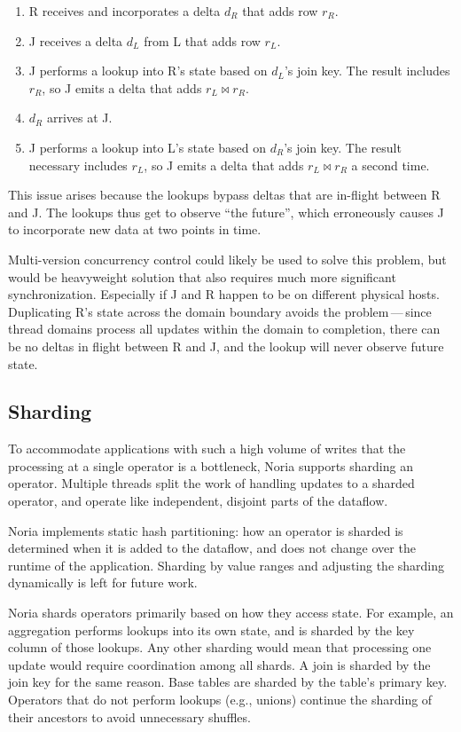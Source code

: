 \begin{enumerate}
  \item R receives and incorporates a delta $d_R$ that adds row $r_R$.
  \item J receives a delta $d_L$ from L that adds row $r_L$.
  \item J performs a lookup into R's state based on $d_L$'s join key. The result
        includes $r_R$, so J emits a delta that adds $r_L \bowtie r_R$.
  \item $d_R$ arrives at J.
  \item J performs a lookup into L's state based on $d_R$'s join key. The result
        necessary includes $r_L$, so J emits a delta that adds $r_L \bowtie r_R$
        a second time.
\end{enumerate}

This issue arises because the lookups bypass deltas that are in-flight between R
and J. The lookups thus get to observe ``the future'', which erroneously causes
J to incorporate new data at two points in time.

Multi-version concurrency control could likely be used to solve this problem,
but would be heavyweight solution that also requires much more significant
synchronization. Especially if J and R happen to be on different physical hosts.
Duplicating R's state across the domain boundary avoids the problem\,---\,since
thread domains process all updates within the domain to completion, there can be
no deltas in flight between R and J, and the lookup will never observe future
state.

\subsection{Sharding}
\label{s:noria:sharding}

To accommodate applications with such a high volume of writes that the
processing at a single operator is a bottleneck, Noria supports sharding an
operator. Multiple threads split the work of handling updates to a sharded
operator, and operate like independent, disjoint parts of the dataflow.

Noria implements static hash partitioning: how an operator is sharded is
determined when it is added to the dataflow, and does not change over the
runtime of the application. Sharding by value ranges and adjusting the sharding
dynamically is left for future work.

Noria shards operators primarily based on how they access state. For example, an
aggregation performs lookups into its own state, and is sharded by the key
column of those lookups. Any other sharding would mean that processing one
update would require coordination among all shards. A join is sharded by the
join key for the same reason. Base tables are sharded by the table's primary
key. Operators that do not perform lookups (e.g., unions) continue the sharding
of their ancestors to avoid unnecessary shuffles.

